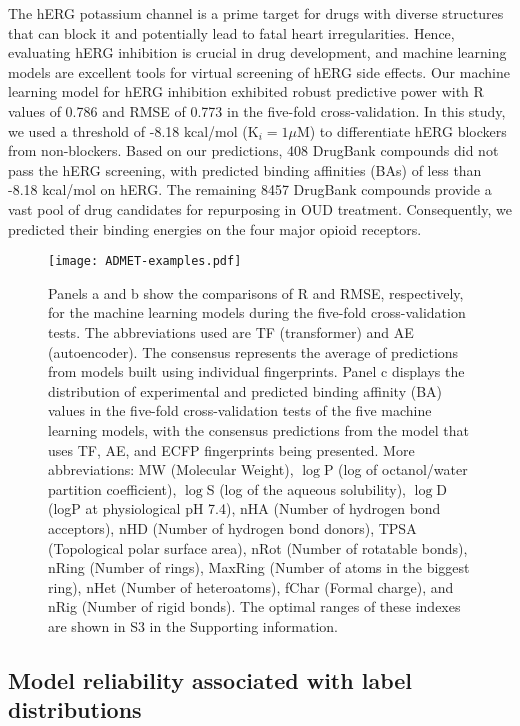 \documentclass[10pt]{article}
\begin{document}
		The hERG potassium channel is a prime target for drugs with diverse structures that can block it and potentially lead to fatal heart irregularities. Hence, evaluating hERG inhibition is crucial in drug development, and machine learning models are excellent tools for virtual screening of hERG side effects. Our machine learning model for hERG inhibition exhibited robust predictive power with R values of 0.786 and RMSE of 0.773 in the five-fold cross-validation. In this study, we used a threshold of -8.18 kcal/mol (K$_i=1\mu$M) to differentiate hERG blockers from non-blockers. Based on our predictions, 408 DrugBank compounds did not pass the hERG screening, with predicted binding affinities (BAs) of less than -8.18 kcal/mol on hERG. The remaining 8457 DrugBank compounds provide a vast pool of drug candidates for repurposing in OUD treatment. Consequently, we predicted their binding energies on the four major opioid receptors.
		
		\begin{figure}[ht]
			\centering
			\texttt{[image: ADMET-examples.pdf]} 
			\caption{{\footnotesize Panels a and b show the comparisons of R and RMSE, respectively, for the machine learning models during the five-fold cross-validation tests. The abbreviations used are TF (transformer) and AE (autoencoder). The consensus represents the average of predictions from models built using individual fingerprints. Panel c displays the distribution of experimental and predicted binding affinity (BA) values in the five-fold cross-validation tests of the five machine learning models, with the consensus predictions from the model that uses TF, AE, and ECFP fingerprints being presented. More abbreviations: 
					MW (Molecular Weight), 
					$\log$P (log of octanol/water partition coefficient),  
					$\log$S (log of the aqueous  solubility), 
					$\log$D (logP at physiological pH 7.4), 
					nHA (Number of hydrogen bond acceptors), 
					nHD (Number of hydrogen bond donors), 
					TPSA (Topological polar surface area), 
					nRot (Number of rotatable bonds), 
					nRing (Number of rings), 
					MaxRing (Number of atoms in the biggest ring), 
					nHet (Number of heteroatoms), 
					fChar (Formal charge), and 
					nRig (Number of rigid bonds). The optimal ranges of these indexes  are shown in S3 in the Supporting information.} }
			\label{Fig:ADMET-examples}
		\end{figure} 
		
		
		\subsection{Model reliability associated with label distributions}		
		
\end{document}
